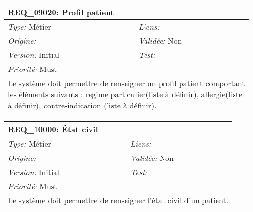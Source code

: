 \begin{table}[!h]

\begin{tabular}{|p{60mm}p{100mm}|}

\hline

\multicolumn{2}{|l|}{\textbf{REQ\_09020:} Profil patient} \\ \hline

\emph{Type:} Métier & \emph{Liens:}  \\

\emph{Origine:}  & \emph{Validée:} Non \\

\emph{Version:} Initial & \emph{Test:}  \\

\emph{Priorité:} Must & \\ \hline

\multicolumn{2}{|p{16cm}|}{Le système doit permettre de renseigner un profil patient comportant les éléments suivants : regime particulier(liste à définir), allergie(liste à définir), contre-indication (liste à définir).} \\ \hline

\end{tabular}

\end{table}



\begin{table}[!h]

\begin{tabular}{|p{60mm}p{100mm}|}

\hline

\multicolumn{2}{|l|}{\textbf{REQ\_10000:} État civil} \\ \hline

\emph{Type:} Métier & \emph{Liens:}  \\

\emph{Origine:}  & \emph{Validée:} Non \\

\emph{Version:} Initial & \emph{Test:}  \\

\emph{Priorité:} Must & \\ \hline

\multicolumn{2}{|p{16cm}|}{Le système doit permettre de renseigner l'état civil d'un patient.} \\ \hline

\end{tabular}

\end{table}



